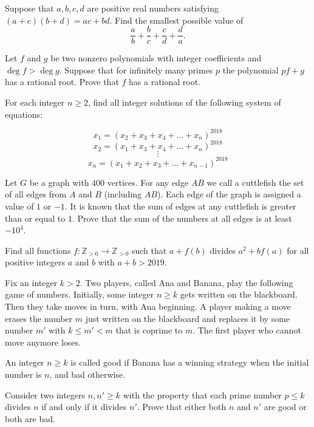 \documentclass[11pt]{scrartcl}
\begin{document}
\begin{problem}[132497611943266]
Suppose that $a,b,c,d$ are positive real numbers satisfying $(a+c)(b+d)=ac+bd$. Find the smallest possible value of
$$\frac{a}{b}+\frac{b}{c}+\frac{c}{d}+\frac{d}{a}.$$
\end{problem}
\begin{problem}[7144061033013]
Let $f$ and $g$ be two nonzero polynomials with integer coefficients and $\deg f>\deg g$. Suppose that for infinitely many primes $p$ the polynomial $pf+g$ has a rational root. Prove that $f$ has a rational root.
\end{problem}
\begin{problem}[204202362084074]
	For each integer $n \ge 2$, find all integer solutions of the following system of equations:

\[x_1 = (x_2 + x_3 + x_4 + ... + x_n)^{2018}\]\[x_2 = (x_1 + x_3 + x_4 + ... + x_n)^{2018}\]\[\vdots\]\[x_n = (x_1 + x_2 + x_3 + ... + x_{n - 1})^{2018}\]
\end{problem}
\begin{problem}[5347245479409093202]
Let $G$ be a graph with $400$ vertices. For any edge $AB$ we call a cuttlefish the set of all edges from $A$ and $B$ (including $AB$). Each edge of the graph is assigned a value of $1$ or $-1$. It is known that the sum of edges at any cuttlefish is greater than or equal to $1$.
Prove that the sum of the numbers at all edges is at least $-10^4$.
\end{problem}
\begin{problem}[3435532350205377704]
Find all functions $f:\mathbb Z_{>0}\to \mathbb Z_{>0}$ such that $a+f(b)$ divides $a^2+bf(a)$ for all positive integers $a$ and $b$ with $a+b>2019$.
\end{problem}
\begin{problem}[7636650160414045108]
Fix an integer $k>2$. Two players, called Ana and Banana, play the following game of numbers. Initially, some integer $n \ge k$ gets written on the blackboard. Then they take moves in turn, with Ana beginning. A player making a move erases the number $m$ just written on the blackboard and replaces it by some number $m'$ with $k \le m' < m$ that is coprime to $m$. The first player who cannot move anymore loses.

An integer $n \ge k $ is called good if Banana has a winning strategy when the initial number is $n$, and bad otherwise.

Consider two integers $n,n' \ge k$ with the property that each prime number $p \le k$ divides $n$ if and only if it divides $n'$. Prove that either both $n$ and $n'$ are good or both are bad.
\end{problem}
\end{document}
